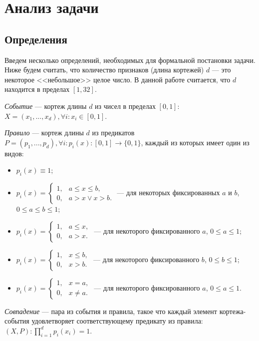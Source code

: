 \documentclass[14pt]{article}
\begin{document}
\section{Анализ задачи}
\subsection{Определения}
Введем несколько определений, необходимых для формальной постановки задачи.
Ниже будем считать, что количество признаков (длина кортежей) $d$ --- это некоторое <<небольшое>> целое число.
В данной работе считается, что $d$ находится в пределах $[1, 32]$.

\emph{Событие} --- кортеж длины $d$ из чисел в пределах $[0, 1]$: $X = (x_1,...,x_d), \forall i: x_i \in [0, 1]$.

\emph{Правило} --- кортеж длины $d$ из предикатов $P = (p_1,...,p_d), \forall i: p_i(x): [0, 1] \rightarrow \{0, 1\}$, каждый из которых имеет один из видов:
\begin{itemize}
    \item $p_i(x) \equiv 1$;
    \item $ p_i(x) =
        \begin{cases}
        1, & a \leq x \leq b, \\
        0, & a > x \vee x > b.
        \end{cases}
    $ --- для некоторых фиксированных $a$ и $b$, $0 \leq a \leq b \leq 1$;
    \item $ p_i(x) =
        \begin{cases}
        1, & a \leq x, \\
        0, & a > x.
        \end{cases}
    $ --- для некоторого фиксированного $a$, $0 \leq a \leq 1$;
    \item $ p_i(x) =
        \begin{cases}
        1, & x \leq b, \\
        0, & x > b.
        \end{cases}
    $ --- для некоторого фиксированного $b$, $0 \leq b \leq 1$;
    \item $ p_i(x) =
        \begin{cases}
        1, & x = a, \\
        0, & x \neq a.
        \end{cases}
    $ --- для некоторого фиксированного $a$, $0 \leq a \leq 1$.
\end{itemize}

\emph{Совпадение} --- пара из события и правила, такое что каждый элемент кортежа-события удовлетворяет соответствующему предикату из правила: $(X, P): \prod_{i=1}^d p_i(x_i) = 1$.
\end{document}
